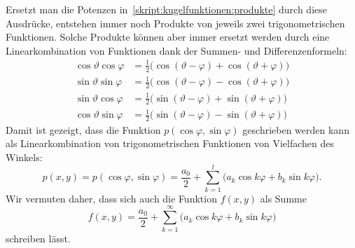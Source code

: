 Ersetzt man die Potenzen in~\eqref{skript:kugelfunktionen:produkte}
durch diese Ausdrücke, entstehen immer noch Produkte von jeweils
zwei trigonometrischen Funktionen.
Solche Produkte können aber immer ersetzt werden durch eine
Linearkombination von Funktionen dank der Summen- und Differenzenformeln:
\begin{align*}
\cos\vartheta\cos\varphi
&=
\frac12\bigl(\cos(\vartheta-\varphi)+\cos(\vartheta+\varphi)\bigr)
\\
\sin\vartheta\sin\varphi
&=
\frac12\bigl(\cos(\vartheta-\varphi)-\cos(\vartheta+\varphi)\bigr)
\\
\sin\vartheta\cos\varphi
&=
\frac12\bigl(\sin(\vartheta-\varphi)+\sin(\vartheta+\varphi)\bigr)
\\
\cos\vartheta\sin\varphi
&=
\frac12\bigl(\sin(\vartheta-\varphi)-\sin(\vartheta+\varphi)\bigr)
\end{align*}
Damit ist gezeigt, dass die Funktion $p(\cos\varphi,\sin\varphi)$
geschrieben werden kann als Linearkombination von trigonometrischen
Funktionen von Vielfachen des Winkels:
\[
p(x,y)=p(\cos\varphi,\sin\varphi)
=
\frac{a_0}2
+
\sum_{k=1}^l \bigl(
a_k\cos k\varphi+b_k\sin k\varphi
\bigr).
\]
Wir vermuten daher, dass sich auch die Funktion $f(x,y)$ als Summe
\begin{equation}
f(x,y)
=
\frac{a_0}2
+
\sum_{k=1}^\infty \bigl(
a_k\cos k\varphi+b_k\sin k\varphi
\bigr)
\label{skript:kugelfunktionen:fourierreihe}
\end{equation}
schreiben lässt.


